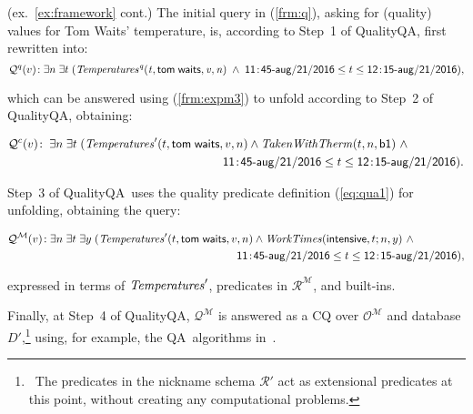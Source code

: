 \documentclass[format=acmsmall, review=false, screen=true]{acmart}
\newcommand{\ucq}{UCQ}
\newcommand{\mc}[1]{\mathcal{ #1}}
\newcommand{\nit}[1]{{\it #1}}
\newcommand{\CQQA}{{\sf QualityQA}}
\newcommand{\qa}{QA}
\newcommand{\red}[1]{{#1}}
\newcommand{\blue}[1]{{#1}}
\newcommand{\commos}[1]{{\vspace{2mm}\noindent \bf \blue{COMM(MOSTAFA):}}~ #1 \hfill {\bf
    END.}\\}
\begin{document}

\begin{example} \label{ex:framework-qa} (ex.~\ref{ex:framework} cont.)  The initial query in (\ref{frm:q}), asking for (quality) values for Tom Waits' temperature, is, according to Step~1 of \CQQA,  first rewritten into:
{\small $$\mc{Q}^q(v)\!: \exists n\;\exists t\;({\it Temperatures^q(t,{\sf tom\;waits},v,n)} \; \wedge \; {\sf 11\!:\!45\mbox{-}aug\mbox{/}21\mbox{/}2016} \le t \le {\sf 12\!:\!15\mbox{-}aug\mbox{/}21\mbox{/}2016}),$$}

\vspace{-4mm} \noindent which can be answered using (\ref{frm:expm3}) to unfold according to Step~2 of \CQQA, obtaining:

\vspace{-4mm}
\begin{align*}
\mc{Q}^c(v)\!:\;\exists n\;\exists t\;(&\nit{Temperatures}'(t,{\sf tom\;waits},v,n) \wedge \nit{TakenWithTherm}(t,n,{\sf b1}) \ \wedge\\
                     &~~~~~~~~~~~~~~~~~~~~~~~~~~~~~~~~~~~{\sf 11\!:\!45\mbox{-}aug\mbox{/}21\mbox{/}2016} \le t \le {\sf 12\!:\!15\mbox{-}aug\mbox{/}21\mbox{/}2016}).
\end{align*}
\vspace{-4mm}

Step~3 of \CQQA \ uses the quality predicate definition (\ref{eq:qua1}) for unfolding, obtaining the query:%

\vspace{-4mm}
{\small \begin{align*}
\mc{Q}^{\mc{M}}(v)\!:\exists n\;\exists t\;\exists y\;(&\nit{Temperatures}'(t,{\sf tom\;waits},v,n)  \wedge  \nit{WorkTimes}({\sf intensive},t;n,y) \ \wedge \\
&~~~~~~~~~~~~~~~~~~~~~~~~~~~~~~~~~~~~~{\sf 11\!:\!45\mbox{-}aug\mbox{/}21\mbox{/}2016} \le t \le {\sf 12\!:\!15\mbox{-}aug\mbox{/}21\mbox{/}2016}),
\end{align*}}

\vspace{-4mm}
\noindent expressed in terms of $\nit{Temperatures}'$, predicates in $\mc{R}^\mc{M}$, and built-ins.


Finally, at Step~4 of \CQQA, $\mc{Q}^\mc{M}$ is answered as a CQ over $\mc{O}^\mc{M}$ and database $D'$,\footnote{\ The predicates in the nickname schema $\mc{R}'$ act as extensional predicates at this point, without creating any computational problems.} using, for example, the \qa \ algorithms in~\cite{milani16rr-cali,milani16rr}.


\end{example}
\end{document}
